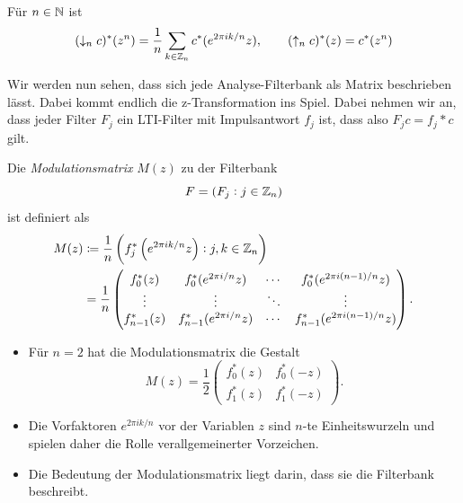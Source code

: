 \begin{proposition}
Für $ n \in \mathbb{N} $ ist
\[
    (\downarrow_{n}c)^{*}(z^{n})
  = \frac{1}{n} \sum_{k \in \mathbb{Z}_{n}} c^{*}(e^{2\pi ik/n}z), \qquad
    (\uparrow_{n}c)^{*}(z) = c^{*}(z^{n})
\]
\end{proposition}

Wir werden nun sehen, dass sich jede Analyse-Filterbank als Matrix beschrieben lässt. Dabei kommt
endlich die z-Transformation ins Spiel. Dabei nehmen wir an, dass jeder Filter $ F_{j} $ ein
LTI-Filter mit Impulsantwort $ f_{j} $ ist, dass also $ F_{j}c = f_{j} * c $ gilt.

\begin{definition}[Modulationsmatrix]
Die \emph{Modulationsmatrix} $ M(z) $ zu der Filterbank
\[
  F = (F_{j} : j \in \mathbb{Z}_{n})
\]
ist definiert als
\begin{align*}
   M(z)
  &\coloneqq \frac{1}{n} \left( f_{j}^{*} \left( e^{2\pi ik/n}z \right) : j,k \in \mathbb{Z}_{n} \right) \\
  &= \frac{1}{n} \begin{pmatrix}
    f_{0}^{*}(z) & f_{0}^{*}(e^{2\pi i/n}z) & \cdots & f_{0}^{*}(e^{2\pi i(n-1)/n}z) \\
    \vdots & \vdots & \ddots & \vdots \\
    f_{n-1}^{*}(z) & f_{n-1}^{*}(e^{2\pi i/n}z) & \cdots & f_{n-1}^{*}(e^{2\pi i(n-1)/n}z)
  \end{pmatrix}.
\end{align*}
\end{definition}

\begin{remark}[Modulationsmatrix] \leavevmode
\begin{itemize}
\item Für $ n = 2 $ hat die Modulationsmatrix die Gestalt
  \[
    M(z) = \frac{1}{2}
    \begin{pmatrix}
      f_{0}^{*}(z) & f_{0}^{*}(-z) \\
      f_{1}^{*}(z) & f_{1}^{*}(-z)
    \end{pmatrix}.
  \]
\item Die Vorfaktoren $ e^{2\pi ik/n} $ vor der Variablen $ z $ sind $ n $-te Einheitswurzeln und
  spielen daher die Rolle verallgemeinerter Vorzeichen.
\item Die Bedeutung der Modulationsmatrix liegt darin, dass sie die Filterbank beschreibt.
\end{itemize}
\end{remark}

